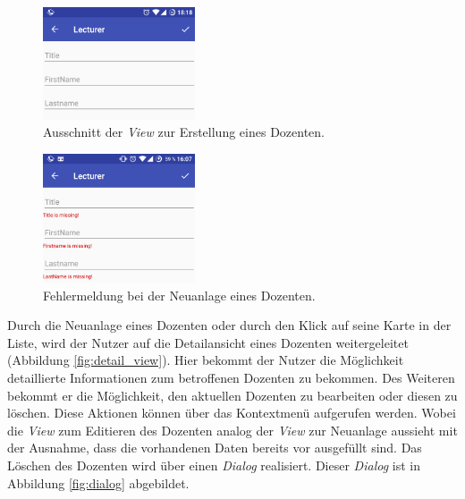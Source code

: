\begin{figure}[H]
	\begin{center}
		\includegraphics[width=0.4\textwidth]{images/input_small.png}
		\caption{Ausschnitt der \textit{View} zur Erstellung eines Dozenten.}
		\label{fig:input_view}
	\end{center}
\end{figure}

\begin{figure}[H]
	\begin{center}
		\includegraphics[width=0.4\textwidth]{images/input_error.png}
		\caption{Fehlermeldung bei der Neuanlage eines Dozenten.}
		\label{fig:input_error}
	\end{center}
\end{figure}

Durch die Neuanlage eines Dozenten oder durch den Klick auf seine Karte in der Liste, wird der Nutzer auf die Detailansicht eines Dozenten weitergeleitet (Abbildung \ref{fig:detail_view}). Hier bekommt der Nutzer die Möglichkeit detaillierte Informationen zum betroffenen Dozenten zu bekommen. Des Weiteren bekommt er die Möglichkeit, den aktuellen Dozenten zu bearbeiten oder diesen zu löschen. Diese Aktionen können über das Kontextmenü aufgerufen werden. Wobei die \textit{View} zum Editieren des Dozenten analog der \textit{View} zur Neuanlage aussieht mit der Ausnahme, dass die vorhandenen Daten bereits vor ausgefüllt sind. Das Löschen des Dozenten wird über einen \textit{Dialog} realisiert. Dieser \textit{Dialog} ist in Abbildung \ref{fig:dialog} abgebildet.

